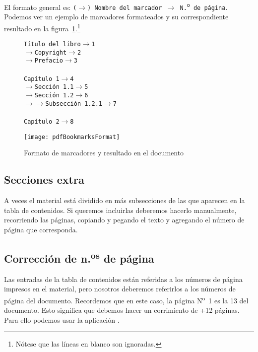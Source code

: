 \documentclass[%
	a5paper,
	10pt,
	twoside,
	openright,
	final,
]{memoir}
\begin{document}
	El formato general es: \texttt{($\longrightarrow$) Nombre del marcador $\longrightarrow$ N.\textsuperscript{o} de página}. Podemos ver un ejemplo de marcadores formateados y su correspondiente resultado en la figura~\ref{fig:pdfBookmarksFormat}.\footnote{Nótese que las líneas en blanco son ignoradas.}

	\begin{figure}
		\footnotesize
		\begin{minipage}{.55\linewidth}
			\texttt{Título del libro$\longrightarrow$1\\
				$\longrightarrow$Copyright$\longrightarrow$2\\
				$\longrightarrow$Prefacio$\longrightarrow$3\\\\
				Capítulo 1$\longrightarrow$4\\
				$\longrightarrow$Sección 1.1$\longrightarrow$5\\
				$\longrightarrow$Sección 1.2$\longrightarrow$6\\
				$\longrightarrow\longrightarrow$Subsección 1.2.1$\longrightarrow$7\\\\
				Capítulo 2$\longrightarrow$8}
		\end{minipage}\hfill
		\begin{minipage}{.43\linewidth}
			\texttt{[image: pdfBookmarksFormat]}
		\end{minipage}%
		\caption{Formato de marcadores y resultado en el documento\label{fig:pdfBookmarksFormat}}
	\end{figure}

	\subsection{Secciones extra} A veces el material está dividido en más subsecciones de las que aparecen en la tabla de contenidos. Si queremos incluirlas deberemos hacerlo manualmente, recorriendo las páginas, copiando y pegando el texto y agregando el número de página que corresponda.

	\subsection{Corrección de \texorpdfstring{n.\textsuperscript{os}}{n.os} de página} Las entradas de la tabla de contenidos están referidas a los números de página impresos en el material, pero nosotros deberemos referirlos a los números de página del documento. Recordemos que en este caso, la página N\textsuperscript{o}~1 es la 13 del documento. Esto significa que debemos hacer un corrimiento de +12 páginas. Para ello podemos usar la aplicación \pdg.
\end{document}
